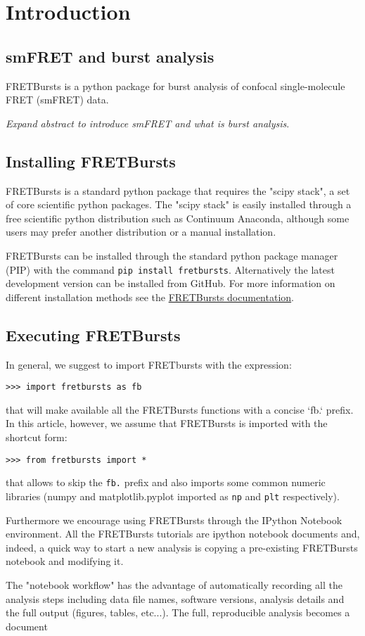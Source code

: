 \section{Introduction}

\subsection{smFRET and burst analysis}

FRETBursts is a python package for burst analysis of confocal single-molecule FRET 
(smFRET) data.

\textit{Expand abstract to introduce smFRET and what is burst analysis}.

\subsection{Installing FRETBursts}
FRETBursts is a standard python package that requires the "scipy stack", a set of core 
scientific python packages.
The "scipy stack" is easily installed through a free scientific python distribution such as Continuum Anaconda, although some users may prefer another distribution or a manual installation.

FRETBursts can be installed through the standard python package manager (PIP) with 
the command \texttt{pip install fretbursts}. Alternatively the latest development version can be installed from GitHub.
For more information on different installation methods see the \href{http://fretbursts.readthedocs.org/en/latest/installation.html}{FRETBursts documentation}.

\subsection{Executing FRETBursts}
In general, we suggest to import FRETbursts with the expression:

\begin{verbatim}
>>> import fretbursts as fb
\end{verbatim}

that will make available all the FRETBursts functions with a concise `fb.` prefix. In this article, however, we assume that FRETBursts is imported with the shortcut form:

\begin{verbatim}
>>> from fretbursts import *
\end{verbatim}

that allows to skip the \verb|fb.| prefix and also imports some common numeric libraries (numpy and matplotlib.pyplot imported as \verb|np| and \verb|plt| respectively).

Furthermore we encourage using FRETBursts through the IPython Notebook environment. All the FRETBursts tutorials are ipython notebook documents and, indeed, a quick way to start a new analysis is copying a pre-existing FRETBursts notebook and modifying it.

The "notebook workflow"\cite{Shen_2014} has the advantage of automatically recording all the analysis steps including
data file names, software versions, analysis details and the full output (figures, tables, etc...). The full, reproducible analysis becomes a document 


